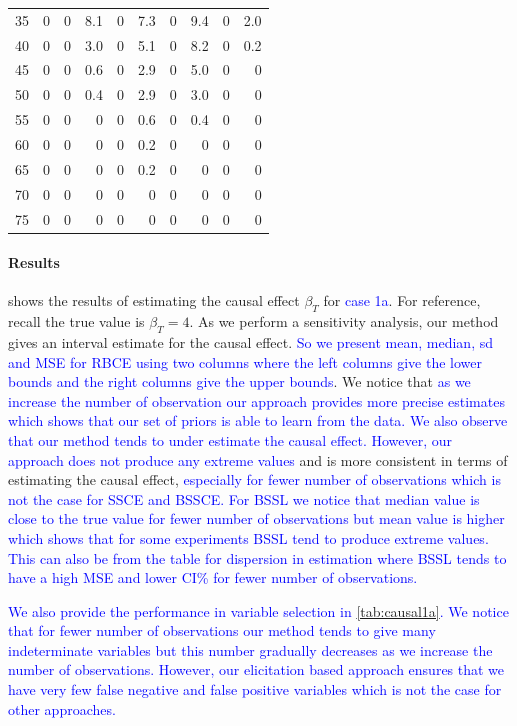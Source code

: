 \documentclass[preprint,12pt]{elsarticle}
\newcommand{\added}[1]{\textcolor{blue}{#1}}
\begin{document}
\begin{table}[ht]
\begin{tabular}{l|rrr|rr|rr|rr}
		35 & 0 & 0 & 8.1 & 0 & 7.3 & 0 & 9.4 & 0 & 2.0 \\ 
		40 & 0 & 0 & 3.0 & 0 & 5.1 & 0 & 8.2 & 0 & 0.2 \\ 
		45 & 0 & 0 & 0.6 & 0 & 2.9 & 0 & 5.0 & 0 & 0 \\ 
		50 & 0 & 0 & 0.4 & 0 & 2.9 & 0 & 3.0 & 0 & 0 \\ 
		55 & 0 & 0 & 0 & 0 & 0.6 & 0 & 0.4 & 0 & 0 \\ 
		60 & 0 & 0 & 0 & 0 & 0.2 & 0 & 0 & 0 & 0 \\ 
		65 & 0 & 0 & 0 & 0 & 0.2 & 0 & 0 & 0 & 0 \\ 
		70 & 0 & 0 & 0 & 0 & 0 & 0 & 0 & 0 & 0 \\ 
		75 & 0 & 0 & 0 & 0 & 0 & 0 & 0 & 0 & 0 \\ 
		\hline
	\end{tabular}
\end{table}

\paragraph{Results}
 shows the results of estimating the causal effect $\beta_T$
for \added{case 1a}.
For reference, recall the true value is $\beta_T=4$. 
As we perform a sensitivity analysis,
our method gives an interval estimate for the causal effect.
\added{So we present mean, median, sd and MSE for RBCE using two columns where the left columns give the lower bounds
and the right columns give the upper bounds}. We notice that 
\added{as we increase the number of observation our approach provides more precise estimates which shows that our set of priors is able to learn from the data. We also observe that our method tends to under estimate the causal effect. However, our approach does not produce any extreme values} and is more consistent
in terms of estimating the causal effect, \added{especially for fewer number of observations which is not the case for SSCE and BSSCE. For BSSL we notice that median value is close to the true value for fewer number of observations but mean value is higher which shows that for some experiments BSSL tend to produce extreme values. This can also be from the table for dispersion in estimation where BSSL tends to have a high MSE and lower CI\% for fewer number of observations.}

\added{We also provide the performance in variable selection in \cref{tab:causal1a}. We notice that for fewer number of observations
our method tends to give many indeterminate variables but this number gradually decreases as we increase the number of observations. However, our elicitation based approach ensures that we have very few false negative and false positive variables which is not the case for other approaches.}
\end{document}
